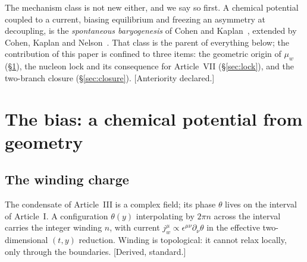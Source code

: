 \documentclass[11pt,a4paper]{article}
\begin{document}
The mechanism class is not new either, and we say so first. A chemical
potential coupled to a current, biasing equilibrium and freezing an asymmetry
at decoupling, is the \emph{spontaneous baryogenesis} of Cohen and
Kaplan~\cite{CohenKaplan}, extended by Cohen, Kaplan and
Nelson~\cite{CKN}. That class is the parent of everything below; the
contribution of this paper is confined to three items: the geometric origin of
$\mu_w$ (\S\ref{sec:bias}), the nucleon lock and its consequence for
Article~VII (\S\ref{sec:lock}), and the two-branch closure
(\S\ref{sec:closure}). [Anteriority declared.]

\section{The bias: a chemical potential from geometry}
\label{sec:bias}

\subsection{The winding charge}
The condensate of Article~III is a complex field; its phase $\theta$ lives on
the interval of Article~I. A configuration $\theta(y)$ interpolating by $2\pi
n$ across the interval carries the integer winding $n$, with current
$j_w^\mu\propto\epsilon^{\mu\nu}\partial_\nu\theta$ in the effective
two-dimensional $(t,y)$ reduction. Winding is topological: it cannot relax
locally, only through the boundaries. [Derived, standard.]
\end{document}
